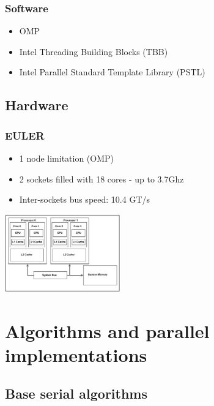 \documentclass{beamer}
\begin{document}
\begin{frame}
\frametitle{Software}
\centering

\begin{itemize}
\item OMP
\item Intel Threading Building Blocks (TBB)
\item Intel Parallel Standard Template Library (PSTL)
\end{itemize}

\end{frame}

\subsection{Hardware}

\begin{frame}
\frametitle{EULER}
\centering

\begin{itemize}
\item 1 node limitation (OMP)
\item 2 sockets filled with 18 cores - up to 3.7Ghz
\item Inter-sockets bus speed: 10.4 GT/s
\end{itemize}

\includegraphics[width=5cm]{dual_sockets_caches.png}
\end{frame}



\section{Algorithms and parallel implementations}

\subsection{Base serial algorithms}
\end{document}
